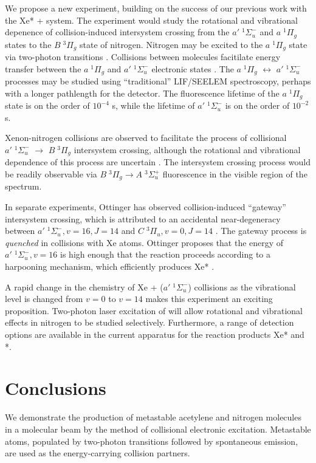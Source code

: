 We propose a new experiment, building on the success of our previous
work with the Xe* +  system.  The experiment would study the
rotational and vibrational depenence of collision-induced intersystem
crossing from the $a' \; ^1\Sigma_u^-$ and $a \; ^1\Pi_g$ states to
the $B \; ^3\Pi_g$ state of nitrogen.  Nitrogen may be excited to the
$a \; ^1\Pi_g$ state via two-photon transitions \cite{vanveen82}.
Collisions between  molecules facitilate energy transfer
between the $a \; ^1\Pi_g$ and $a' \; ^1\Sigma_u^-$ electronic states
\cite{marinelli88}.  The $a \; ^1\Pi_g$ $\leftrightarrow$ $a' \;
^1\Sigma_u^-$ processes may be studied using ``traditional''
LIF/SEELEM spectroscopy, perhaps with a longer pathlength for the
detector.  The fluorescence lifetime of the $a \; ^1\Pi_g$ state is on
the order of $10^{-4}$ s, while the lifetime of $a' \; ^1\Sigma_u^-$
is on the order of $10^{-2}$ s.

Xenon-nitrogen collisions are observed to facilitate the process of
collisional $a' \; ^1\Sigma_u^-$ $\rightarrow$ $B \; ^3\Pi_g$
intersystem crossing, although the rotational and vibrational
dependence of this process are uncertain \cite{umemoto03a}.  The
intersystem crossing process would be readily observable via $B \;
^3\Pi_g \rightarrow A \; ^3\Sigma_u^+$ fluorescence in the visible
region of the spectrum.

In separate experiments, Ottinger has observed collision-induced
``gateway'' intersystem crossing, which is attributed to an accidental
near-degeneracy between $a' \; ^1\Sigma_u^-, v=16, J=14$ and $C \;
^3\Pi_u, v=0, J=14$ \cite{ottinger98}.  The gateway process is
\emph{quenched} in collisions with Xe atoms.  Ottinger proposes that
the energy of $a' \; ^1\Sigma_u^-, v=16$ is high enough that the
reaction proceeds according to a harpooning mechanism, which
efficiently produces Xe* \cite{ottinger98}.

A rapid change in the chemistry of Xe + ($a' \; ^1\Sigma_u^-$)
collisions as the vibrational level is changed from $v=0$ to $v=14$
makes this experiment an exciting proposition.  Two-photon laser
excitation of  will allow rotational and vibrational effects in
nitrogen to be studied selectively.  Furthermore, a range of detection
options are available in the current apparatus for the reaction
products Xe* and *.

\section{Conclusions}

We demonstrate the production of metastable acetylene and nitrogen
molecules in a molecular beam by the method of collisional electronic
excitation.  Metastable atoms, populated by two-photon transitions
followed by spontaneous emission, are used as the energy-carrying
collision partners.


%  
% 
% 
